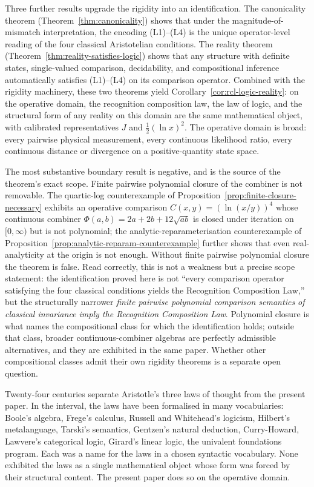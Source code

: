 \documentclass[11pt,a4paper]{article}
\theoremstyle{definition}
\theoremstyle{remark}
\begin{document}
Three further results upgrade the rigidity into an identification.
The canonicality theorem (Theorem~\ref{thm:canonicality}) shows that
under the magnitude-of-mismatch interpretation, the encoding
(L1)--(L4) is the unique operator-level reading of the four classical
Aristotelian conditions. The reality theorem
(Theorem~\ref{thm:reality-satisfies-logic}) shows that any structure
with definite states, single-valued comparison, decidability, and
compositional inference automatically satisfies (L1)--(L4) on its
comparison operator. Combined with the rigidity machinery, these
two theorems yield Corollary~\ref{cor:rcl-logic-reality}: on the
operative domain, the recognition composition law, the law of logic,
and the structural form of any reality on this domain are the same
mathematical object, with calibrated representatives $J$ and
$\tfrac{1}{2}(\ln x)^2$. The operative domain is broad: every pairwise
physical measurement, every continuous likelihood ratio, every
continuous distance or divergence on a positive-quantity state space.

The most substantive boundary result is negative, and is the source
of the theorem's exact scope. Finite pairwise polynomial closure of
the combiner is not removable. The quartic-log counterexample of
Proposition~\ref{prop:finite-closure-necessary} exhibits an operative
comparison $C(x, y) = (\ln(x/y))^4$ whose continuous combiner
$\Phi(a, b) = 2a + 2b + 12\sqrt{ab}$ is closed under iteration on
$[0, \infty)$ but is not polynomial; the analytic-reparameterisation
counterexample of Proposition~\ref{prop:analytic-reparam-counterexample}
further shows that even real-analyticity at the origin is not enough.
Without finite pairwise polynomial closure the theorem is false. Read
correctly, this is not a weakness but a precise scope statement: the
identification proved here is not ``every comparison operator
satisfying the four classical conditions yields the Recognition
Composition Law,'' but the structurally narrower
\emph{finite pairwise polynomial comparison semantics of classical
invariance imply the Recognition Composition Law}. Polynomial
closure is what names the compositional class for which the
identification holds; outside that class, broader continuous-combiner
algebras are perfectly admissible alternatives, and they are exhibited
in the same paper. Whether other compositional classes admit their
own rigidity theorems is a separate open question.

Twenty-four centuries separate Aristotle's three laws of thought from
the present paper. In the interval, the laws have been formalised in
many vocabularies: Boole's algebra, Frege's calculus, Russell and
Whitehead's logicism, Hilbert's metalanguage, Tarski's semantics,
Gentzen's natural deduction, Curry-Howard, Lawvere's categorical
logic, Girard's linear logic, the univalent foundations program. Each
was a name for the laws in a chosen syntactic vocabulary. None
exhibited the laws as a single mathematical object whose form was
forced by their structural content. The present paper does so on the
operative domain.
\end{document}
